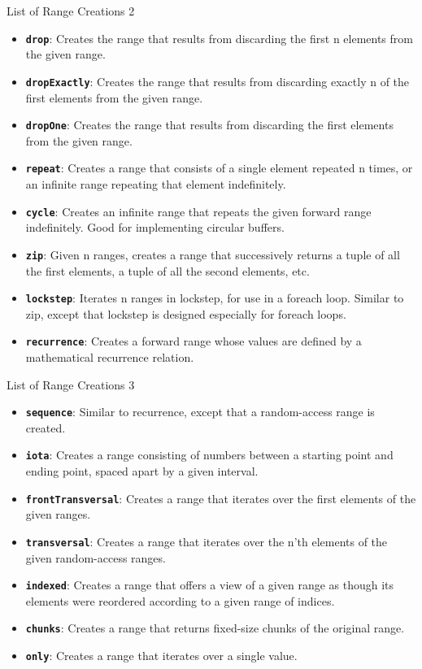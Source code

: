 \documentclass[xcolor=dvipsnames]{beamer}
\begin{document}
\begin{frame}[fragile]{List of Range Creations 2}
  \begin{itemize}[<+->]
  \item \textbf{\texttt{drop}}: Creates the range that results from discarding the first
    n elements from the given range.
  \item \textbf{\texttt{dropExactly}}: Creates the range that results from discarding
    exactly n of the first elements from the given range.
  \item \textbf{\texttt{dropOne}}: Creates the range that results from discarding the
    first elements from the given range.
  \item \textbf{\texttt{repeat}}: Creates a range that consists of a single element
    repeated n times, or an infinite range repeating that element indefinitely.
  \item \textbf{\texttt{cycle}}: Creates an infinite range that repeats the given forward
    range indefinitely. Good for implementing circular buffers.
  \item \textbf{\texttt{zip}}: Given n ranges, creates a range that successively returns
    a tuple of all the first elements, a tuple of all the second elements, etc.
  \item \textbf{\texttt{lockstep}}: Iterates n ranges in lockstep, for use in a foreach
    loop. Similar to zip, except that lockstep is designed especially for
    foreach loops.
  \item \textbf{\texttt{recurrence}}: Creates a forward range whose values are defined by
    a mathematical recurrence relation.
  \end{itemize}
\end{frame}

\begin{frame}[fragile]{List of Range Creations 3}
  \begin{itemize}[<+->]
  \item \textbf{\texttt{sequence}}: Similar to recurrence, except that a random-access
    range is created.
  \item \textbf{\texttt{iota}}: Creates a range consisting of numbers between a starting
    point and ending point, spaced apart by a given interval.
  \item \textbf{\texttt{frontTransversal}}: Creates a range that iterates over the first
    elements of the given ranges.
  \item \textbf{\texttt{transversal}}: Creates a range that iterates over the n'th
    elements of the given random-access ranges.
  \item \textbf{\texttt{indexed}}: Creates a range that offers a view of a given range as
    though its elements were reordered according to a given range of indices.
  \item \textbf{\texttt{chunks}}: Creates a range that returns fixed-size chunks of the
    original range.
  \item \textbf{\texttt{only}}: Creates a range that iterates over a single value.
  \end{itemize}
\end{frame}
\end{document}
